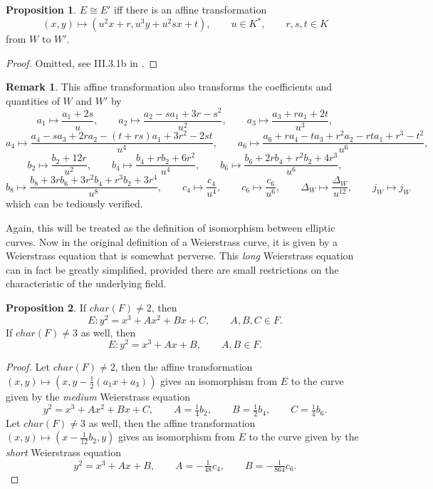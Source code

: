 \documentclass{article}
\newcommand{\rb}[1]{\left( #1 \right)}
\theoremstyle{definition}\newtheorem*{definition}{Definition}
\theoremstyle{definition}\newtheorem*{example}{Example}
\theoremstyle{definition}\newtheorem*{remark}{Remark}
\newtheorem{proposition}{Proposition}[subsection]
\begin{document}
\begin{proposition}
\label{prop:affine}
$ E \cong E' $ iff there is an affine transformation
$$ \rb{x, y} \mapsto \rb{u^2x + r, u^3y + u^2sx + t}, \qquad u \in K^*, \qquad r, s, t \in K $$
from $ W $ to $ W' $.
\end{proposition}

\begin{proof}
Omitted, see III.3.1b in \cite{gtm}.
\end{proof}

\begin{remark}
This affine transformation also transforms the coefficients and quantities of $ W $ and $ W' $ by
$$ a_1 \mapsto \dfrac{a_1 + 2s}{u}, \qquad a_2 \mapsto \dfrac{a_2 - sa_1 + 3r - s^2}{u^2}, \qquad a_3 \mapsto \dfrac{a_3 + ra_1 + 2t}{u^3}, $$
$$ a_4 \mapsto \dfrac{a_4 - sa_3 + 2ra_2 - \rb{t + rs}a_1 + 3r^2 - 2st}{u^4}, \qquad a_6 \mapsto \dfrac{a_6 + ra_4 - ta_3 + r^2a_2 - rta_1 + r^3 - t^2}{u^6}, $$
$$ b_2 \mapsto \dfrac{b_2 + 12r}{u^2}, \qquad b_4 \mapsto \dfrac{b_4 + rb_2 + 6r^2}{u^4}, \qquad b_6 \mapsto \dfrac{b_6 + 2rb_4 + r^2b_2 + 4r^3}{u^6}, $$
$$ b_8 \mapsto \dfrac{b_8 + 3rb_6 + 3r^2b_4 + r^3b_2 + 3r^4}{u^8}, \qquad c_4 \mapsto \dfrac{c_4}{u^4}, \qquad c_6 \mapsto \dfrac{c_6}{u^6}, \qquad \Delta_W \mapsto \dfrac{\Delta_W}{u^{12}}, \qquad j_W \mapsto j_W $$
which can be tediously verified.
\end{remark}

Again, this will be treated as the definition of isomorphism between elliptic curves. Now in the original definition of a Weierstrass curve, it is given by a Weierstrass equation that is somewhat perverse. This \emph{long} Weierstrass equation can in fact be greatly simplified, provided there are small restrictions on the characteristic of the underlying field.

\begin{proposition}
If $ char\rb{F} \ne 2 $, then
$$ E : y^2 = x^3 + Ax^2 + Bx + C, \qquad A, B, C \in F. $$
If $ char\rb{F} \ne 3 $ as well, then
$$ E : y^2 = x^3 + Ax + B, \qquad A, B \in F. $$
\end{proposition}

\begin{proof}
Let $ char\rb{F} \ne 2 $, then the affine transformation $ \rb{x, y} \mapsto \rb{x, y - \tfrac{1}{2}\rb{a_1x + a_3}} $ gives an isomorphism from $ E $ to the curve given by the \emph{medium} Weierstrass equation
$$ y^2 = x^3 + Ax^2 + Bx + C, \qquad A = \tfrac{1}{4}b_2, \qquad B = \tfrac{1}{2}b_4, \qquad C = \tfrac{1}{4}b_6. $$
Let $ char\rb{F} \ne 3 $ as well, then the affine transformation $ \rb{x, y} \mapsto \rb{x - \tfrac{1}{12}b_2, y} $ gives an isomorphism from $ E $ to the curve given by the \emph{short} Weierstrass equation
$$ y^2 = x^3 + Ax + B, \qquad A = -\tfrac{1}{48}c_4, \qquad B = -\tfrac{1}{864}c_6. $$
\end{proof}
\end{document}
